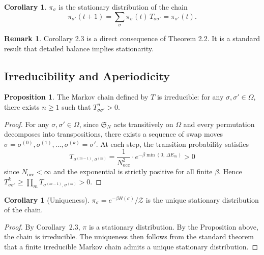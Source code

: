 \documentclass[12pt, a4paper]{article}
\theoremstyle{definition}
\newtheorem{proposition}{Proposition}[section]
\newtheorem{corollary}[theorem]{Corollary}
\newtheorem{remark}{Remark}[section]
\begin{document}
\begin{corollary}
    $\pi_{\sigma}$ is the stationary distribution of the chain
    \begin{equation}
        \pi_{\sigma'}(t+1) = \sum_\sigma \pi_\sigma(t)\,T_{\sigma \sigma'} = \pi_{\sigma'}(t).
    \end{equation}
\end{corollary}

\begin{remark}
Corollary 2.3 is a direct consequence of Theorem 2.2. 
It is a standard result that detailed balance implies stationarity.
\end{remark}

\subsection{Irreducibility and Aperiodicity}

\begin{proposition}
The Markov chain defined by $T$ is irreducible: for any 
$\sigma, \sigma' \in \Omega$, there exists $n \geq 1$ such that 
$T^n_{\sigma\sigma'} > 0$.
\end{proposition}

\begin{proof}
For any $\sigma, \sigma' \in \Omega$, since $\mathfrak{S}_N$ acts
transitively on $\Omega$ and every permutation decomposes into
transpositions, there exists
a sequence of swap moves $\sigma = \sigma^{(0)}, \sigma^{(1)},
\ldots, \sigma^{(k)} = \sigma'$.
At each step, the transition probability satisfies
\[
    T_{\sigma^{(m-1)},\sigma^{(m)}}
    = \frac{1}{N_{\mathrm{occ}}^2}
      \cdot e^{-\beta\min(0,\,\Delta E_m)} > 0
\]
since $N_{\mathrm{occ}} < \infty$ and the exponential is strictly
positive for all finite $\beta$. Hence $T^k_{\sigma\sigma'} \geq
\prod_m T_{\sigma^{(m-1)},\sigma^{(m)}} > 0$.
\end{proof}

\begin{corollary}[Uniqueness]
$\pi_\sigma = e^{-\beta H(\sigma)}/\mathcal{Z}$ is the unique 
stationary distribution of the chain.
\end{corollary}

\begin{proof}
By Corollary~2.3, $\pi$ is a stationary distribution.
By the Proposition above, the chain is irreducible.
The uniqueness then follows from the standard theorem that
a finite irreducible Markov chain admits a unique stationary
distribution.
\end{proof}
\end{document}

